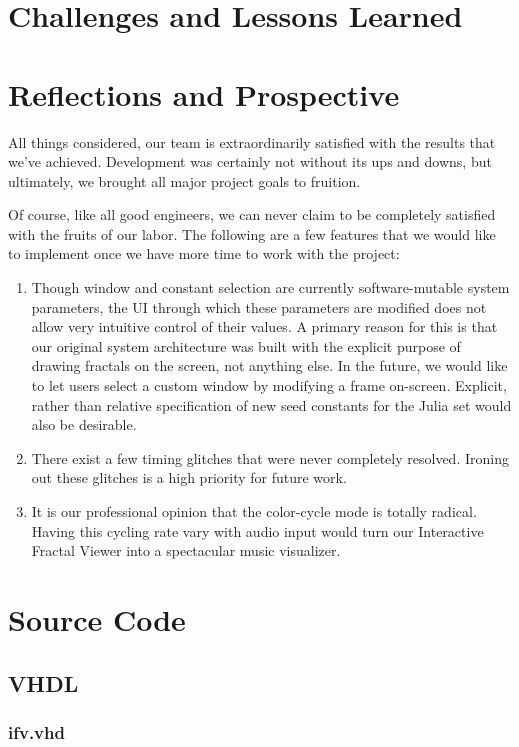 \documentclass{article}
\begin{document}
\section{Challenges and Lessons Learned}

\section{Reflections and Prospective}

All things considered, our team is extraordinarily satisfied with the results that we've achieved. 
Development was certainly not without its ups and downs, but ultimately, we brought all major project
goals to fruition. 

Of course, like all good engineers, we can never claim to be completely satisfied with the fruits of our
labor. The following are a few features that we would like to implement once we have more time 
to work with the project:

\begin{enumerate}
\item Though window and constant selection are currently software-mutable system parameters, the UI through
which these parameters are modified does not allow very intuitive control of their values. A primary reason
for this is that our original system architecture was built with the explicit purpose of drawing fractals on the
screen, not anything else. In the future, we would like to let users select a custom window by modifying a frame 
on-screen. Explicit, rather than relative specification of new seed constants for the Julia set would also be 
desirable.
\item There exist a few timing glitches that were never completely resolved. Ironing out these glitches is a high
priority for future work.
\item It is our professional opinion that the color-cycle mode is totally radical. Having this cycling rate vary 
with audio input would turn our Interactive Fractal Viewer into a spectacular music visualizer.
\end{enumerate}

\appendix
\section{Source Code}
\subsection{VHDL}
\subsubsection{ifv.vhd}							%
\end{document}
